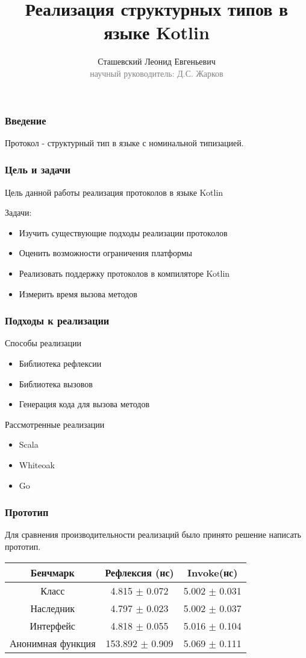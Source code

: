 \documentclass{beamer}
\begin{document}
\title[Структурный типы в языке Kotlin]{Реализация структурных типов в языке Kotlin}
\author[Сташевский Л.Е.]{Сташевский Леонид Евгеньевич\\{\footnotesize\textcolor{gray}{научный руководитель: Д.С. Жарков}}}
\frame{\titlepage}

\begin{frame}\frametitle{Введение}
Протокол - структурный тип в языке с номинальной типизацией.
\end{frame}

\begin{frame}\frametitle{Цель и задачи}
Цель данной работы реализация протоколов в языке Kotlin

Задачи:
\begin{itemize}
    \item Изучить существующие подходы реализации протоколов
    \item Оценить возможности ограничения платформы
    \item Реализовать поддержку протоколов в компиляторе Kotlin
    \item Измерить время вызова методов
\end{itemize}
\end{frame}

\begin{frame}\frametitle{Подходы к реализации}
Способы реализации
\begin{itemize}
    \item Библиотека рефлексии
    \item Библиотека вызовов
    \item Генерация кода для вызова методов
\end{itemize}
Рассмотренные реализации
\begin{itemize}
    \item Scala
    \item Whiteoak
    \item Go
\end{itemize}
\end{frame}

\begin{frame}\frametitle{Прототип}
Для сравнения производительности реализаций было принято решение написать прототип.
\begin{table}[h]
\begin{tabular}{|c|c|c|} \hline
Бенчмарк & Рефлексия (нс) & Invoke(нс) \\ \hline
Класс & 4.815 $\pm$ 0.072 & 5.002 $\pm$ 0.031 \\ \hline
Наследник & 4.797 $\pm$ 0.023 & 5.002 $\pm$ 0.037 \\ \hline
Интерфейс & 4.818 $\pm$ 0.055 & 5.016 $\pm$ 0.104 \\ \hline
Анонимная функция & 153.892 $\pm$ 0.909 & 5.069 $\pm$ 0.111 \\ \hline
\end{tabular}
\end{table}
\end{frame}
\end{document}
